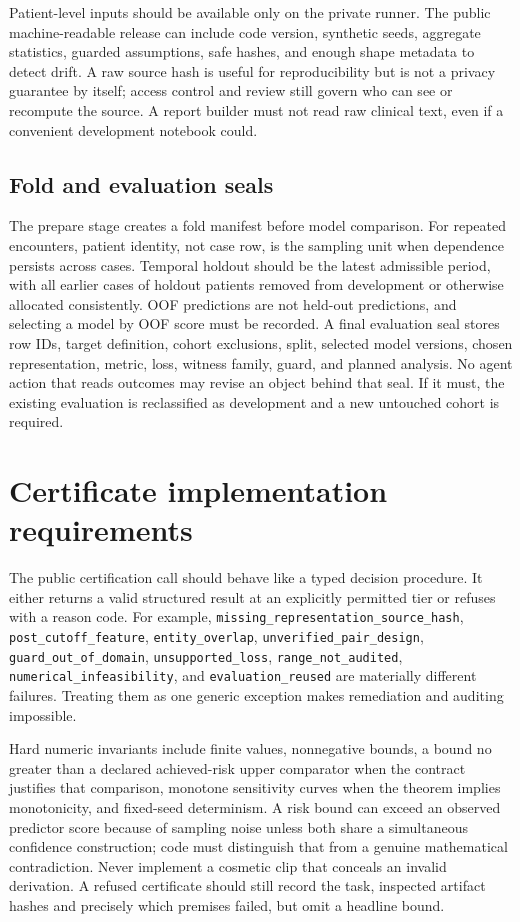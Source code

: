 \documentclass[11pt]{article}
\begin{document}
Patient-level inputs should be available only on the private runner. The public machine-readable release can include code version, synthetic seeds, aggregate statistics, guarded assumptions, safe hashes, and enough shape metadata to detect drift. A raw source hash is useful for reproducibility but is not a privacy guarantee by itself; access control and review still govern who can see or recompute the source. A report builder must not read raw clinical text, even if a convenient development notebook could.

\subsection{Fold and evaluation seals}
The prepare stage creates a fold manifest before model comparison. For repeated encounters, patient identity, not case row, is the sampling unit when dependence persists across cases. Temporal holdout should be the latest admissible period, with all earlier cases of holdout patients removed from development or otherwise allocated consistently. OOF predictions are not held-out predictions, and selecting a model by OOF score must be recorded. A final evaluation seal stores row IDs, target definition, cohort exclusions, split, selected model versions, chosen representation, metric, loss, witness family, guard, and planned analysis. No agent action that reads outcomes may revise an object behind that seal. If it must, the existing evaluation is reclassified as development and a new untouched cohort is required.

\section{Certificate implementation requirements}
The public certification call should behave like a typed decision procedure. It either returns a valid structured result at an explicitly permitted tier or refuses with a reason code. For example, \texttt{missing\_representation\_source\_hash}, \texttt{post\_cutoff\_feature}, \texttt{entity\_overlap}, \texttt{unverified\_pair\_design}, \texttt{guard\_out\_of\_domain}, \texttt{unsupported\_loss}, \texttt{range\_not\_audited}, \texttt{numerical\_infeasibility}, and \texttt{evaluation\_reused} are materially different failures. Treating them as one generic exception makes remediation and auditing impossible.

Hard numeric invariants include finite values, nonnegative bounds, a bound no greater than a declared achieved-risk upper comparator when the contract justifies that comparison, monotone sensitivity curves when the theorem implies monotonicity, and fixed-seed determinism. A risk bound can exceed an observed predictor score because of sampling noise unless both share a simultaneous confidence construction; code must distinguish that from a genuine mathematical contradiction. Never implement a cosmetic clip that conceals an invalid derivation. A refused certificate should still record the task, inspected artifact hashes and precisely which premises failed, but omit a headline bound.
\end{document}
